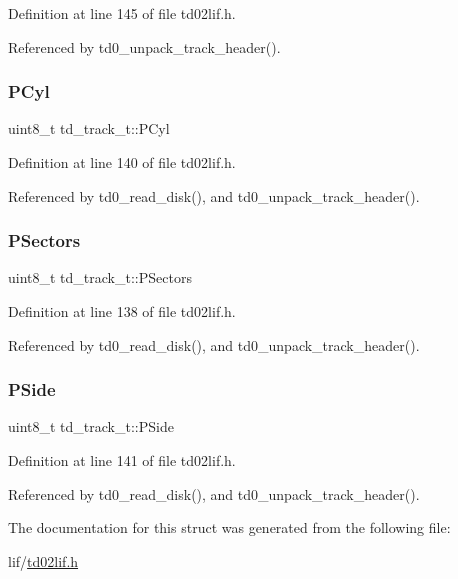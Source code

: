 Definition at line 145 of file td02lif.\+h.



Referenced by td0\+\_\+unpack\+\_\+track\+\_\+header().

\mbox{\label{structtd__track__t_a479a4bf60fcfdcbca513ebdea33b8e8c}} 
\subsubsection{\texorpdfstring{P\+Cyl}{PCyl}}
{\footnotesize\ttfamily uint8\+\_\+t td\+\_\+track\+\_\+t\+::\+P\+Cyl}



Definition at line 140 of file td02lif.\+h.



Referenced by td0\+\_\+read\+\_\+disk(), and td0\+\_\+unpack\+\_\+track\+\_\+header().

\mbox{\label{structtd__track__t_a8f8ba7a0392f869f062f46d50a11bdfa}} 
\subsubsection{\texorpdfstring{P\+Sectors}{PSectors}}
{\footnotesize\ttfamily uint8\+\_\+t td\+\_\+track\+\_\+t\+::\+P\+Sectors}



Definition at line 138 of file td02lif.\+h.



Referenced by td0\+\_\+read\+\_\+disk(), and td0\+\_\+unpack\+\_\+track\+\_\+header().

\mbox{\label{structtd__track__t_af2074402835d514cbf7f5f40e25fa284}} 
\subsubsection{\texorpdfstring{P\+Side}{PSide}}
{\footnotesize\ttfamily uint8\+\_\+t td\+\_\+track\+\_\+t\+::\+P\+Side}



Definition at line 141 of file td02lif.\+h.



Referenced by td0\+\_\+read\+\_\+disk(), and td0\+\_\+unpack\+\_\+track\+\_\+header().



The documentation for this struct was generated from the following file\+:\begin{DoxyCompactItemize}
\item 
lif/\hyperlink{td02lif_8h}{td02lif.\+h}\end{DoxyCompactItemize}
